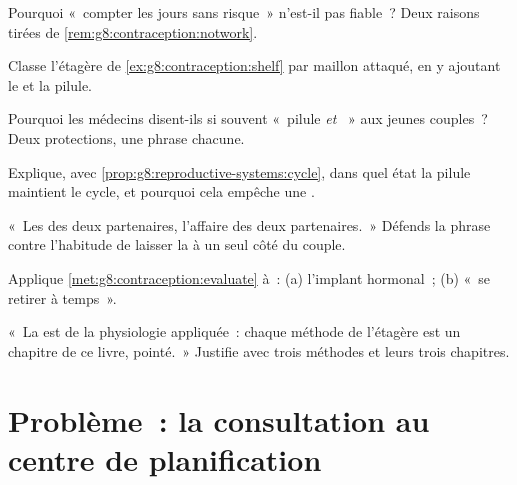 \begin{exercise}[$\star$]\label{exo:g8:contraception:6}
Pourquoi «~compter les jours sans risque~» n'est-il pas fiable~?
Deux raisons tirées de \cref{rem:g8:contraception:notwork}.
\end{exercise}

\begin{exercise}[$\star\star$]\label{exo:g8:contraception:7}
Classe l'étagère de \cref{ex:g8:contraception:shelf} par maillon
attaqué, en y ajoutant le  et la pilule.
\end{exercise}

\begin{exercise}[$\star\star$]\label{exo:g8:contraception:8}
Pourquoi les médecins disent-ils si souvent «~pilule \emph{et}
~» aux jeunes couples~? Deux protections, une phrase
chacune.
\end{exercise}

\begin{exercise}[$\star\star$]\label{exo:g8:contraception:9}
Explique, avec
\cref{prop:g8:reproductive-systems:cycle}, dans quel état la pilule
maintient le cycle, et pourquoi cela empêche une .
\end{exercise}

\begin{exercise}[$\star\star$]\label{exo:g8:contraception:10}
«~Les  des deux partenaires, l'affaire des deux
partenaires.~» Défends la phrase contre l'habitude de laisser la
 à un seul côté du couple.
\end{exercise}

\begin{exercise}[$\star\star$]\label{exo:g8:contraception:11}
Applique \cref{met:g8:contraception:evaluate} à~: (a) l'implant
hormonal~; (b) «~se retirer à temps~».
\end{exercise}

\begin{exercise}[$\star\star\star$]\label{exo:g8:contraception:12}
«~La  est de la physiologie appliquée~: chaque méthode
de l'étagère est un chapitre de ce livre, pointé.~» Justifie avec
trois méthodes et leurs trois chapitres.
\end{exercise}

\section{Problème~: la consultation au centre de planification}

